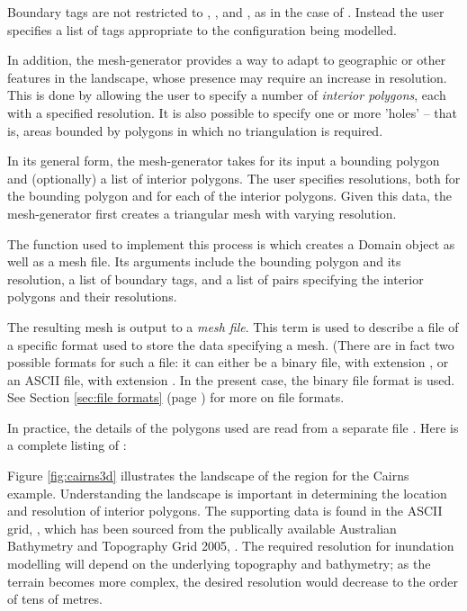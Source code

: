 \documentclass{manual}
\begin{document}
Boundary tags are not restricted to , ,
 and , as in the case of
. Instead the user specifies a list of
tags appropriate to the configuration being modelled.

In addition, the mesh-generator provides a way to adapt to geographic or
other features in the landscape, whose presence may require an
increase in resolution. This is done by allowing the user to specify
a number of \emph{interior polygons}, each with a specified
resolution. It is also
possible to specify one or more 'holes' -- that is, areas bounded by
polygons in which no triangulation is required.

In its general form, the mesh-generator takes for its input a bounding
polygon and (optionally) a list of interior polygons. The user
specifies resolutions, both for the bounding polygon and for each of
the interior polygons. Given this data, the mesh-generator first creates a
triangular mesh with varying resolution.

The function used to implement this process is
 which creates a Domain object as
well as a mesh file.  Its arguments include the
bounding polygon and its resolution, a list of boundary tags, and a
list of pairs  specifying the interior
polygons and their resolutions.

The resulting mesh is output to a \emph{mesh file}\label{def:mesh file}. This term is used to describe a file of
a specific format used to store the data specifying a mesh. (There
are in fact two possible formats for such a file: it can either be a
binary file, with extension , or an ASCII file, with
extension . In the present case, the binary file format
 is used. See Section \ref{sec:file formats} (page
\pageref{sec:file formats}) for more on file formats.

In practice, the details of the polygons used are read from a
separate file . Here is a complete listing of
:



Figure \ref{fig:cairns3d} illustrates the landscape of the region
for the Cairns example. Understanding the landscape is important in
determining the location and resolution of interior polygons. The
supporting data is found in the ASCII grid, , which
has been sourced from the publically available Australian Bathymetry
and Topography Grid 2005, \cite{grid250}. The required resolution
for inundation modelling will depend on the underlying topography and
bathymetry; as the terrain becomes more complex, the desired resolution
would decrease to the order of tens of metres.
\end{document}

